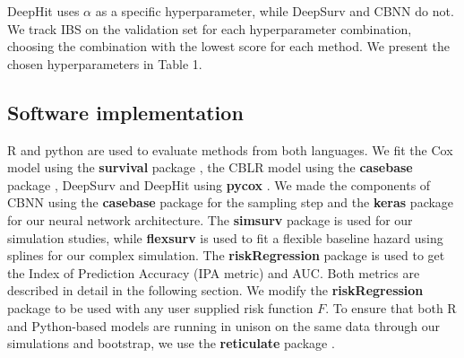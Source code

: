 \documentclass[APA,LATO1COL]{WileyNJD-v2}
\begin{document}
DeepHit uses $\alpha$ as a specific hyperparameter, while DeepSurv and CBNN do not.
We track IBS on the validation set for each hyperparameter combination,
choosing the combination with the lowest score for each method.
We present the chosen hyperparameters in Table 1.

\hypertarget{software-implementation}{%
\subsection{Software implementation}\label{software-implementation}}

R \citep{Rsoft} and python \citep{py} are used to evaluate methods from
both languages. We fit the Cox model using the \textbf{survival} package
\citep{survpkg}, the CBLR model using the \textbf{casebase} package
\citep{cbpkg}, DeepSurv and DeepHit using \textbf{pycox}
\citep{lee2018DeepHit}. We made the components
of CBNN using the \textbf{casebase} package for the sampling step and
the \textbf{keras} \citep{keras} package for our neural network
architecture. The \textbf{simsurv} package \citep{simsurv} is used for
our simulation studies, while \textbf{flexsurv} \citep{flexsurv} is used
to fit a flexible baseline hazard using splines for our complex
simulation. The \textbf{riskRegression}
package \citep{riskRegression} is used to get the Index of Prediction
Accuracy (IPA metric) and AUC. Both metrics are described in detail in the
following section. We modify the \textbf{riskRegression} package to be
used with any user supplied risk function \(F\). To ensure that both R
and Python-based models are running in unison on the same data through
our simulations and bootstrap, we use the \textbf{reticulate} package
\citep{reticulate}.



\end{document}
